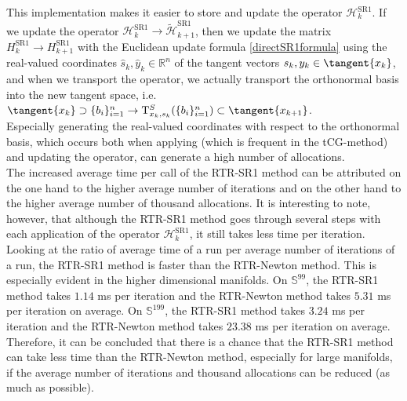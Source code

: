This implementation makes it easier to store and update the operator $\mathcal{H}^{\mathrm{SR1}}_k$. If we update the operator $\mathcal{H}^{\mathrm{SR1}}_k \rightarrow \widetilde{\mathcal{H}}^{\mathrm{SR1}}_{k+1}$, then we update the matrix $H^{\mathrm{SR1}}_k \rightarrow H^{\mathrm{SR1}}_{k+1}$ with the Euclidean update formula \cref{directSR1formula} using the real-valued coordinates $\hat{s}_k, \hat{y}_k \in \mathbb{R}^n$ of the tangent vectors $s_k, y_k \in \tangent{x_k}$, and when we transport the operator, we actually transport the orthonormal basis into the new tangent space, i.e. $\tangent{x_k} \supset \{ b_i \}^{n}_{i=1} \rightarrow \mathrm{T}^{S}_{x_k, s_k}(\{ b_i \}^{n}_{i=1}) \subset \tangent{x_{k+1}}$. \\ 
Especially generating the real-valued coordinates with respect to the orthonormal basis, which occurs both when applying (which is frequent in the tCG-method) and updating the operator, can generate a high number of allocations. \\


The increased average time per call of the RTR-SR1 method can be attributed on the one hand to the higher average number of iterations and on the other hand to the higher average number of thousand allocations. It is interesting to note, however, that although the RTR-SR1 method goes through several steps with each application of the operator $\mathcal{H}^{\mathrm{SR1}}_k$, it still takes less time per iteration. Looking at the ratio of average time of a run per average number of iterations of a run, the RTR-SR1 method is faster than the RTR-Newton method. This is especially evident in the higher dimensional manifolds. On $\mathbb{S}^{99}$, the RTR-SR1 method takes $1.14$ ms per iteration and the RTR-Newton method takes $5.31$ ms per iteration on average. On $\mathbb{S}^{199}$, the RTR-SR1 method takes $3.24$ ms per iteration and the RTR-Newton method takes $23.38$ ms per iteration on average. \\
Therefore, it can be concluded that there is a chance that the RTR-SR1 method can take less time than the RTR-Newton method, especially for large manifolds, if the average number of iterations and thousand allocations can be reduced (as much as possible).
